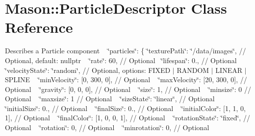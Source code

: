 \hypertarget{class_mason_1_1_particle_descriptor}{}\section{Mason\+:\+:Particle\+Descriptor Class Reference}
\label{class_mason_1_1_particle_descriptor}


Describes a Particle component ~\newline
 \char`\"{}particles\char`\"{}\+: \{ \char`\"{}texture\+Path\char`\"{}\+: \char`\"{}/data/images\char`\"{}, // Optional, default\+: nullptr ~\newline
 \char`\"{}rate\char`\"{}\+: 60, // Optional~\newline
 \char`\"{}lifespan\char`\"{}\+: 0., // Optional ~\newline
 \char`\"{}velocity\+State\char`\"{}\+: \char`\"{}random\char`\"{}, // Optional, options\+: F\+I\+X\+ED $\vert$ R\+A\+N\+D\+OM $\vert$ L\+I\+N\+E\+AR $\vert$ S\+P\+L\+I\+NE ~\newline
 \char`\"{}min\+Velocity\char`\"{}\+: \mbox{[}0, 300, 0\mbox{]}, // Optional ~\newline
 \char`\"{}max\+Velocity\char`\"{}\+: \mbox{[}20, 300, 0\mbox{]}, // Optional ~\newline
 \char`\"{}gravity\char`\"{}\+: \mbox{[}0, 0, 0\mbox{]}, // Optional ~\newline
 \char`\"{}size\char`\"{}\+: 1, // Optional ~\newline
 \char`\"{}minsize\char`\"{}\+: 0 // Optional ~\newline
 \char`\"{}maxsize\char`\"{}\+: 1 // Optional ~\newline
 \char`\"{}size\+State\char`\"{}\+: \char`\"{}linear\char`\"{}, // Optional ~\newline
 \char`\"{}initial\+Size\char`\"{}\+: 0., // Optional ~\newline
 \char`\"{}final\+Size\char`\"{}\+: 0., // Optional ~\newline
 \char`\"{}initial\+Color\char`\"{}\+: \mbox{[}1, 1, 0, 1\mbox{]}, // Optional ~\newline
 \char`\"{}final\+Color\char`\"{}\+: \mbox{[}1, 0, 0, 1\mbox{]}, // Optional ~\newline
 \char`\"{}rotation\+State\char`\"{}\+: \char`\"{}fixed\char`\"{}, // Optional ~\newline
 \char`\"{}rotation\char`\"{}\+: 0, // Optional ~\newline
 \char`\"{}minrotation\char`\"{}\+: 0, // Optional ~\newline
